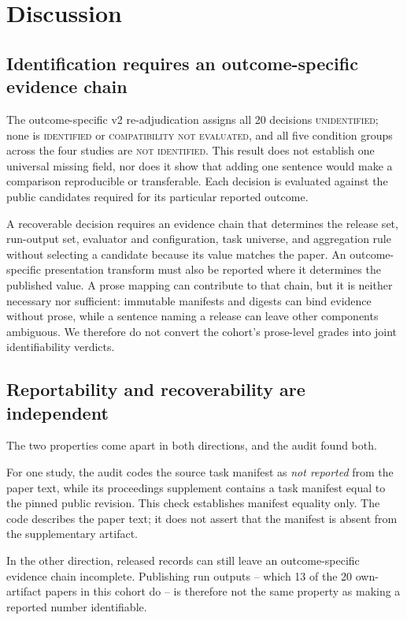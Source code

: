 \section{Discussion}
\label{sec:discussion}

\subsection{Identification requires an outcome-specific evidence chain}

The outcome-specific v2 re-adjudication assigns all 20 decisions \textsc{unidentified}; none
is \textsc{identified} or \textsc{compatibility not evaluated}, and all five condition groups
across the four studies are \textsc{not identified}. This result does not establish one
universal missing field, nor does it show that adding one sentence would make a comparison
reproducible or transferable. Each decision is evaluated against the public candidates
required for its particular reported outcome.

A recoverable decision requires an evidence chain that determines the release set, run-output
set, evaluator and configuration, task universe, and aggregation rule without selecting a
candidate because its value matches the paper. An outcome-specific presentation transform must also
be reported where it determines the published value. A prose mapping can contribute to that
chain, but it is neither necessary nor sufficient: immutable manifests and digests can bind
evidence without prose, while a sentence naming a release can leave other components
ambiguous. We therefore do not convert the cohort's prose-level grades into joint
identifiability verdicts.

\subsection{Reportability and recoverability are independent}

The two properties come apart in both directions, and the audit found both.

For one study, the audit codes the source task manifest as \emph{not reported} from the paper
text, while its proceedings supplement contains a task manifest equal to the pinned public
revision. This check establishes manifest equality only. The code describes the paper text; it
does not assert that the manifest is absent from the supplementary artifact.

In the other direction, released records can still leave an outcome-specific evidence chain
incomplete. Publishing run outputs -- which 13 of the 20 own-artifact papers in this cohort
do -- is therefore not the same property as making a reported number identifiable.

